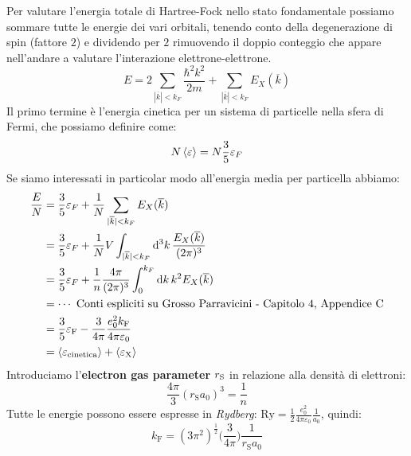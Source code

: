 
\vspace{1.0cm}
\vspace{1.0cm}

Per valutare l'energia totale di Hartree-Fock nello stato fondamentale possiamo sommare tutte le energie dei vari orbitali, tenendo conto della degenerazione di spin (fattore $2$) e dividendo per $2$ rimuovendo il doppio conteggio che appare nell'andare a valutare l'interazione elettrone-elettrone.
\begin{equation*}
    E= 2 \sum_{|\overline k|<k_F} \frac{\hbar^2k^2}{2m} + \sum_{|\overline k|<k_F}E_X(\overline k)
\end{equation*}
Il primo termine è l'energia cinetica per un sistema di particelle nella sfera di Fermi, che possiamo definire come:
\begin{equation*}
    N\expval{\varepsilon}=N\frac 35 \varepsilon_F
\end{equation*}
Se siamo interessati in particolar modo all'energia media per particella abbiamo:
\begin{equation*}
    \begin{aligned}
        \frac E N &= \frac 35\varepsilon_F+\frac 1N \sum_{|\overline k|<k_F}E_X(\overline k) \\
        & = \frac 35\varepsilon_F+\frac 1N V \int_{|\overline k|<k_F}\dd[3]{k}\frac{E_X(\overline k)}{(2\pi)^3}\\
        & = \frac 35\varepsilon_F+\frac 1n \frac{4\pi}{(2\pi)^3}\int_0^{k_F}\dd{k}k^2E_X(\overline k)\\
        & = \cdots \text{ Conti espliciti su Grosso Parravicini - Capitolo 4, Appendice C}\\
        & = \frac 35 \varepsilon_\text{F}- \frac 3{4\pi}\frac{e_0^2k_\text{F}}{4\pi\varepsilon_0} \\
        & = \expval{\varepsilon_{\text{cinetica}}}+\expval{\varepsilon_{\text{X}}}
    \end{aligned}
\end{equation*}
Introduciamo l'\textbf{electron gas parameter} $r_\text S$ in relazione alla densità di elettroni:
\begin{equation*}
    \frac{4\pi}{3}(r_\text{S}a_0)^3=\frac 1 n
\end{equation*}
Tutte le energie possono essere espresse in \textit{Rydberg}: $\text{Ry}=\frac 12 \frac{e_0^2}{4\pi\varepsilon_0}\frac{1}{a_0}$, quindi:
\begin{equation*}
    k_\text{F}=(3\pi^2)^{\frac{1}{2}}\bigg(\frac{3}{4\pi}\bigg)\frac{1}{r_\text{S}a_0}
\end{equation*}
